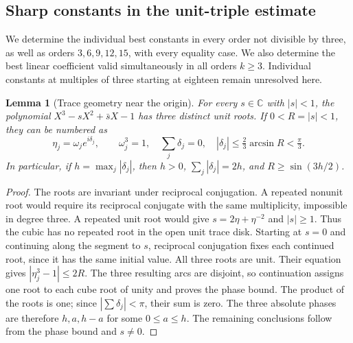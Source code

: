 \documentclass[UTF8,11pt]{ctexart}
\newtheorem{lem}[thm]{Lemma}
\theoremstyle{definition}
\numberwithin{equation}{section}
\newcommand{\C}{\mathbb C}\newcommand{\R}{\mathbb R}
\begin{document}
\subsection{Sharp constants in the unit-triple estimate}
\label{v20:sec:powers}

We determine the individual best constants in every order not divisible
by three, as well as orders $3,6,9,12,15$, with every equality
case. We also determine the best linear coefficient valid simultaneously
in all orders $k\ge3$. Individual constants at multiples of three
starting at eighteen remain unresolved here.

\begin{lem}[Trace geometry near the origin]\label{v21:lem:tracegeometry}
For every $s\in\C$ with $|s|<1$, the polynomial
$X^3-sX^2+\bar sX-1$ has three distinct unit roots. If
$0<R=|s|<1$, they can be numbered as
\[
 \eta_j=\omega_j e^{i\delta_j},\qquad \omega_j^3=1,
 \quad \sum_j\delta_j=0,
 \quad |\delta_j|\le\tfrac23\arcsin R<\tfrac\pi3.
\]
In particular, if $h=\max_j|\delta_j|$, then $h>0$,
$\sum_j|\delta_j|=2h$, and $R\ge\sin(3h/2)$.
\end{lem}
\begin{proof}
The roots are invariant under reciprocal conjugation. A repeated
nonunit root would require its reciprocal conjugate with the same
multiplicity, impossible in degree three. A repeated unit root would
give $s=2\eta+\eta^{-2}$ and $|s|\ge1$. Thus the cubic has no repeated
root in the open unit trace disk. Starting at $s=0$ and continuing
along the segment to $s$, reciprocal conjugation fixes each continued
root, since it has the same initial value. All three roots are unit.
Their equation gives $|\eta_j^3-1|\le2R$. The three resulting arcs
are disjoint, so continuation assigns one root to each cube root of
unity and proves the phase bound. The product of the roots is one;
since $|\sum\delta_j|<\pi$, their sum is zero. The three absolute
phases are therefore $h,a,h-a$ for some $0\le a\le h$.
The remaining conclusions follow from the phase bound and $s\ne0$.
\end{proof}
\end{document}
